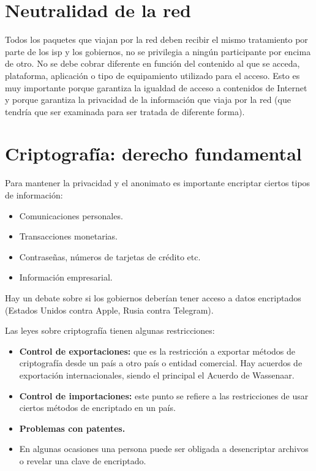 \section{Neutralidad de la red}

Todos los paquetes que viajan por la red deben recibir el mismo tratamiento por parte de los \gls{isp} y los gobiernos, no se privilegia a ningún participante por encima de otro.
No se debe cobrar diferente en función del contenido al que se acceda, plataforma, aplicación o tipo de equipamiento utilizado para el acceso.
Esto es muy importante porque garantiza la igualdad de acceso a contenidos de Internet y porque garantiza la privacidad de la información que viaja por la red (que tendría que ser examinada para ser tratada de diferente forma).

\section{Criptografía: derecho fundamental}

Para mantener la privacidad y el anonimato es importante encriptar ciertos tipos de información:
\begin{itemize}
    \item Comunicaciones personales.
    \item Transacciones monetarias.
    \item Contraseñas, números de tarjetas de crédito etc.
    \item Información empresarial.
\end{itemize}

Hay un debate sobre si los gobiernos deberían tener acceso a datos encriptados (Estados Unidos contra Apple, Rusia contra Telegram).

Las leyes sobre criptografía tienen algunas restricciones:
\begin{itemize}
    \item\textbf{Control de exportaciones:} que es la restricción a exportar métodos de criptografía desde un país a otro país o entidad comercial. Hay acuerdos de exportación internacionales, siendo el principal el Acuerdo de Wassenaar.
    \item\textbf{Control de importaciones:} este punto se refiere a las restricciones de usar ciertos métodos de encriptado en un país.
    \item\textbf{Problemas con patentes.}
    \item En algunas ocasiones una persona puede ser obligada a desencriptar archivos o revelar una clave de encriptado.
\end{itemize}

